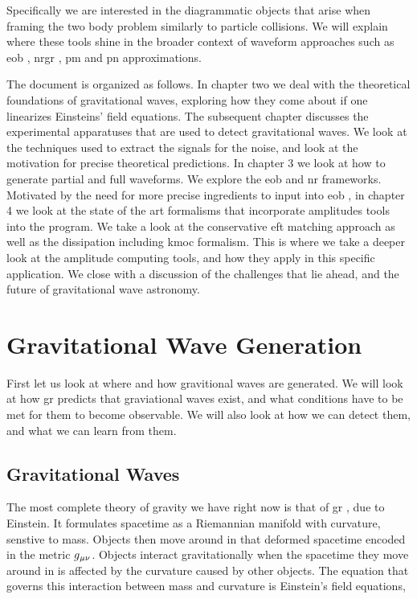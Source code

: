 \documentclass[
  10pt,
  a4paper,
  DIV=11,
  numbers=noendperiod,
  twoside]{scrreprt}
\DeclareRobustCommand{\[}{\begin{equation}}
\DeclareRobustCommand{\]}{\end{equation}}
\begin{document}
Specifically we are interested in the diagrammatic objects that arise
when framing the two body problem similarly to particle collisions. We
will explain where these tools shine in the broader context of waveform
approaches such as \gls{eob} , \gls{nrgr} , \gls{pm} and \gls{pn}
approximations.

The document is organized as follows. In chapter two we deal with the
theoretical foundations of gravitational waves, exploring how they come
about if one linearizes Einsteins' field equations. The subsequent
chapter discusses the experimental apparatuses that are used to detect
gravitational waves. We look at the techniques used to extract the
signals for the noise, and look at the motivation for precise
theoretical predictions. In chapter 3 we look at how to generate partial
and full waveforms. We explore the \gls{eob} and \gls{nr} frameworks.
Motivated by the need for more precise ingredients to input into
\gls{eob} , in chapter 4 we look at the state of the art formalisms that
incorporate amplitudes tools into the program. We take a look at the
conservative \gls{eft} matching approach as well as the dissipation
including \gls{kmoc} formalism. This is where we take a deeper look at
the amplitude computing tools, and how they apply in this specific
application. We close with a discussion of the challenges that lie
ahead, and the future of gravitational wave astronomy.


\hypertarget{gravitational-wave-generation}{%
\chapter{Gravitational Wave
Generation}\label{gravitational-wave-generation}}

First let us look at where and how gravitional waves are generated. We
will look at how \gls{gr} predicts that graviational waves exist, and
what conditions have to be met for them to become observable. We will
also look at how we can detect them, and what we can learn from them.

\hypertarget{gravitational-waves}{%
\section{Gravitational Waves}\label{gravitational-waves}}

The most complete theory of gravity we have right now is that of
\gls{gr} , due to Einstein. It formulates spacetime as a Riemannian
manifold with curvature, senstive to mass. Objects then move around in
that deformed spacetime encoded in the metric \(g{}_{\mu\nu}\). Objects interact
gravitationally when the spacetime they move around in is affected by
the curvature caused by other objects. The equation that governs this
interaction between mass and curvature is Einstein's field equations,
\end{document}
